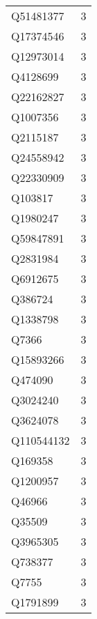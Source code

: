 \begin{tabular}{lr}
   Q51481377 &                             3 \\
   Q17374546 &                             3 \\
   Q12973014 &                             3 \\
    Q4128699 &                             3 \\
   Q22162827 &                             3 \\
    Q1007356 &                             3 \\
    Q2115187 &                             3 \\
   Q24558942 &                             3 \\
   Q22330909 &                             3 \\
     Q103817 &                             3 \\
    Q1980247 &                             3 \\
   Q59847891 &                             3 \\
    Q2831984 &                             3 \\
    Q6912675 &                             3 \\
     Q386724 &                             3 \\
    Q1338798 &                             3 \\
       Q7366 &                             3 \\
   Q15893266 &                             3 \\
     Q474090 &                             3 \\
    Q3024240 &                             3 \\
    Q3624078 &                             3 \\
  Q110544132 &                             3 \\
     Q169358 &                             3 \\
    Q1200957 &                             3 \\
      Q46966 &                             3 \\
      Q35509 &                             3 \\
    Q3965305 &                             3 \\
     Q738377 &                             3 \\
       Q7755 &                             3 \\
    Q1791899 &                             3 \\

\end{tabular}
